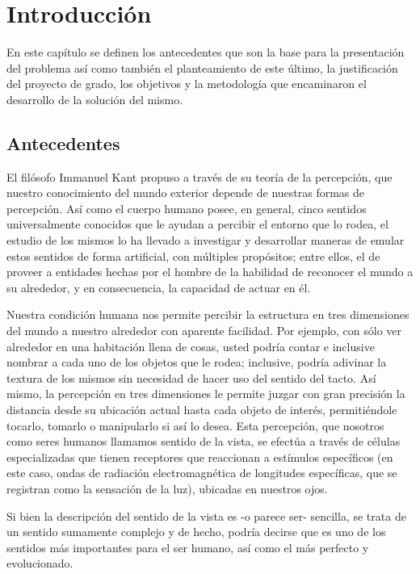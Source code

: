 \chapter{Introducción}

En este capítulo se definen los antecedentes que son la base para la presentación del problema así como también el planteamiento de este último, la justificación del proyecto de grado, los objetivos y la metodología que encaminaron el desarrollo de la solución del mismo.

\section{Antecedentes}

El filósofo Immanuel Kant propuso a través de su teoría de la percepción, que nuestro conocimiento del mundo exterior depende de nuestras formas de percepción. Así como el cuerpo humano posee, en general, cinco sentidos universalmente conocidos que le ayudan a percibir el entorno que lo rodea, el estudio de los mismos lo ha llevado a investigar y desarrollar maneras de emular estos sentidos de forma artificial, con múltiples propósitos; entre ellos, el de proveer a entidades hechas por el hombre de la habilidad de reconocer el mundo a su alrededor, y en consecuencia, la capacidad de actuar en él.

Nuestra condición humana nos permite percibir la estructura en tres dimensiones del mundo a nuestro alrededor con aparente facilidad. Por ejemplo, con sólo ver alrededor en una habitación llena de cosas, usted podría contar e inclusive nombrar a cada uno de los objetos que le rodea; inclusive, podría adivinar la textura de los mismos sin necesidad de hacer uso del sentido del tacto. Así mismo, la percepción en tres dimensiones le permite juzgar con gran precisión la distancia desde su ubicación actual hasta cada objeto de interés, permitiéndole tocarlo, tomarlo o manipularlo si así lo desea. Esta percepción, que nosotros como seres humanos llamamos sentido de la vista, se efectúa a través de células especializadas que tienen receptores que reaccionan a estímulos específicos (en este caso, ondas de radiación electromagnética de longitudes específicas, que se registran como la sensación de la luz), ubicadas en nuestros ojos.

Si bien la descripción del sentido de la vista es -o parece ser- sencilla, se trata de un sentido sumamente complejo y de hecho, podría decirse que es uno de los sentidos más importantes para el ser humano, así como el más perfecto y evolucionado.


